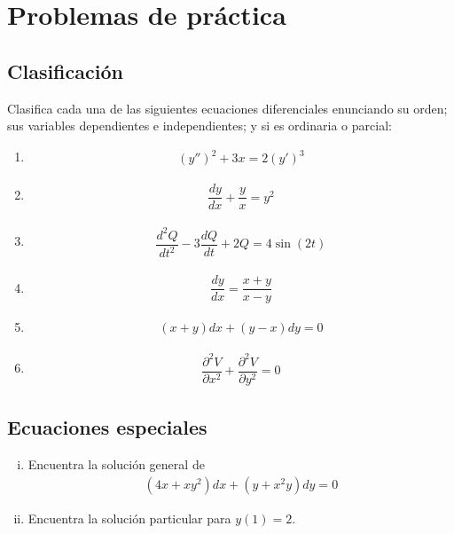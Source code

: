 \section{Problemas de práctica}

\subsection{Clasificación}



\begin{problema}
	Clasifica cada una de las siguientes ecuaciones diferenciales enunciando su orden; sus variables dependientes e independientes; y si es ordinaria o parcial:
	\begin{enumerate}
		\item
		\label{exmp 02_01}
		\begin{align}
			\left(y''\right)^{2}+3x=2\left(y'\right)^3
		\end{align}
		\item
		\label{exmp 02:02}
		\begin{align}
			\dfrac{dy}{dx}+\dfrac{y}{x} = y^2
		\end{align}
		\item
		\label{exmp 02:03}
		\begin{align}
			\dfrac{d^{2}Q}{dt^{2}}-3\dfrac{dQ}{dt}+2Q = 4\sin(2t)
		\end{align}
		\item
		\label{exmp 02:04}
		\begin{align}
			\dfrac{dy}{dx}=\dfrac{x+y}{x-y}
		\end{align}

		\item
		\begin{align}
			(x+y)dx+(y-x)dy = 0
		\end{align}
		\item
		\begin{align}
			\dfrac{\partial^{2}V}{\partial x^{2}} +
			\dfrac{\partial^{2}V}{\partial y^{2}} = 0
		\end{align}
	\end{enumerate}

\end{problema}

\subsection{Ecuaciones especiales}

\begin{problema}
	\begin{enumerate}[(i)]
		\item Encuentra la solución general de
		\begin{align}
			\left( 4x+xy^{2} \right)dx+\left( y+x^{2}y \right)dy = 0
		\end{align}

		\item Encuentra la solución particular para $y(1)=2$.
	\end{enumerate}
\end{problema}

